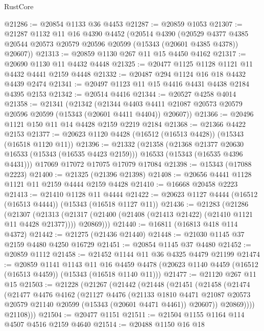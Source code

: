 \begin{lexlean}{RustCore}
\begin{coremodule}
@21286 := @20854 @1133 @36 @4453
@21287 := @20859 @1053
@21307 := @21287
    @1132
    @11
    @16
    @4390
    @4452
    (@20514
      @4390
      (@20529 @4377 @4385 @20544 @20573 @20579 @20596 @20599 (@15343 (@20601 @4385 @4378)) @20607))
@21313 := @20859 @1130 @267 @11 @15 @4450 @4162
@21317 := @20690 @1130 @11 @4432 @4448
@21325 := @20477 @1125 @1128 @1121 @11 @4432 @4441 @2159 @4448
@21332 := @20487 @294 @1124 @16 @18 @4432 @4439 @2474
@21341 := @20497 @1123 @11 @15 @4416 @4431 @4438 @2184 @4395 @2153
@21342 := @20514 @4416
@21344 := @20527 @4258 @4014
@21358 := @21341
    (@21342
      (@21344 @4403 @4411 @21087 @20573 @20579 @20596 @20599 (@15343 (@20601 @4411 @4404)) @20607))
@21366 := @20496 @1121 @150 @11 @14 @4428 @2159 @2219 @2184
@21368 := @21366 @4422 @2153
@21377 := @20623 @1120 @4428 (@16512 (@16513 @4428)) (@15343 (@16518 @1120 @11))
@21396 := @21332
    (@21358
      (@21368 @21377 @20630 @16533 (@15343 (@16535 @4423 @2159)))
      @16533
      (@15343 (@16535 @4396 @4431)))
    @17069
    @17072
    @17075
    @17079
    @17084
@21398 := @15343 (@17088 @2223)
@21400 := @21325 (@21396 @21398)
@21408 := @20656 @4441 @1128 @1121 @11 @2159 @4444 @2159 @4428
@21410 := @16668 @20458 @2223
@21413 := @21410 @1128 @11 @4444
@21422 := @20623 @1127 @4444 (@16512 (@16513 @4444)) (@15343 (@16518 @1127 @11))
@21436 := @21283
    (@21286
      (@21307
        (@21313 (@21317 (@21400 (@21408 (@21413 @21422) (@21410 @1121 @11 @4428 @21377)))) @20869)))
@21440 := @16811 (@16813 @418 @114 @4372)
@21442 := @21275 (@21436 @21440)
@21448 := @21030 @1145 @37 @2159 @4480 @4250 @16729
@21451 := @20854 @1145 @37 @4480
@21452 := @20859 @1112
@21458 := @21452 @1144 @11 @36 @4325 @4479 @21199
@21474 := @20859
    @1141
    @1143
    @11
    @16
    @4459
    @4478
    (@20623 @1140 @4459 (@16512 (@16513 @4459)) (@15343 (@16518 @1140 @11)))
@21477 := @21120 @267 @11 @15
@21503 := @21228
    (@21267
      (@21442
        (@21448
          (@21451
            (@21458
              (@21474
                (@21477
                  @4476
                  @4162
                  (@21127
                    @4476
                    (@21133
                      @1810
                      @4471
                      @21087
                      @20573
                      @20579
                      @21140
                      @20599
                      (@15343 (@20601 @4471 @4461))
                      @20607))
                  @20869))))
          @21108)))
@21504 := @20477 @1151
@21511 := @21504 @1155 @1164 @114 @4507 @4516 @2159 @4640
@21514 := @20488 @1150 @16 @18

\end{coremodule}
\end{lexlean}
